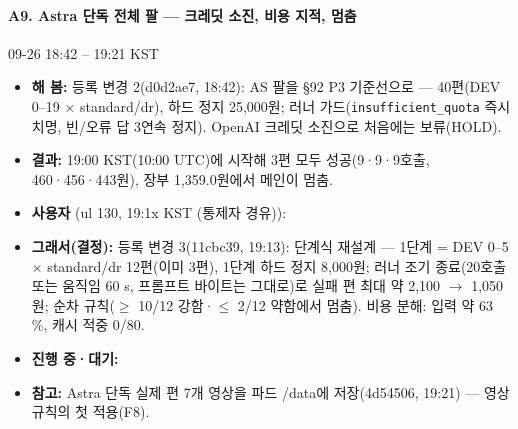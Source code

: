 \paragraph{A9. Astra 단독 전체 팔 --- 크레딧 소진, 비용 지적, 멈춤}
{\small 09-26 18:42 -- 19:21 KST}
\begin{itemize}
  \item \textbf{해 봄:} 등록 변경 2(d0d2ae7, 18:42): AS 팔을 §92 P3 기준선으로 --- 40편(DEV 0--19 $\times$ standard/dr), 하드 정지 25,000원; 러너 가드(\texttt{insufficient\_\allowbreak{}quota} 즉시 치명, 빈/오류 답 3연속 정지). OpenAI 크레딧 소진으로 처음에는 보류(HOLD).
  \item \textbf{결과:} 19:00 KST(10:00 UTC)에 시작해 3편 모두 성공(9·9·9호출, 460·456·443원), 장부 1,359.0원에서 메인이 멈춤.
  \item \textbf{사용자} (ul 130, 19:1x KST (통제자 경유)): 
  \item \textbf{그래서(결정):} 등록 변경 3(11cbc39, 19:13): 단계식 재설계 --- 1단계 = DEV 0--5 $\times$ standard/dr 12편(이미 3편), 1단계 하드 정지 8,000원; 러너 조기 종료(20호출 또는 움직임 60 s, 프롬프트 바이트는 그대로)로 실패 편 최대 약 2,100 $\rightarrow$ 1,050원; 순차 규칙($\geq$ 10/12 강함·$\leq$ 2/12 약함에서 멈춤). 비용 분해: 입력 약 63 \%, 캐시 적중 0/80.
  \item \textbf{진행 중·대기:} 
  \item \textbf{참고:} Astra 단독 실제 편 7개 영상을 파드 /data에 저장(4d54506, 19:21) --- 영상 규칙의 첫 적용(F8).
\end{itemize}

